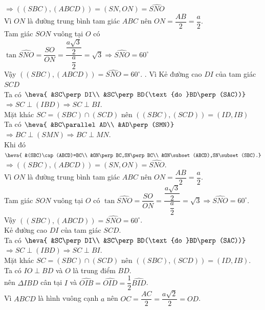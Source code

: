 \begin{ex}
{\begin{itemchoice}
    $\Rightarrow((SBC),(ABCD))=(SN,ON)=\widehat{SNO}$\\
   Vì $ON$  là đường trung bình tam giác $ABC$ nên $ON=\dfrac{AB}{2}=\dfrac{a}{2}$.\\
   Tam giác $SON$ vuông tại $O$ có\\ $\tan\widehat{SNO}=\dfrac{SO}{ON}=\dfrac{\dfrac{a\sqrt 3}{2}}{\dfrac{a}{2}}=\sqrt  3\Rightarrow\widehat{SNO}=60^{\circ}$\\
    Vậy $((SBC),(ABCD))=\widehat{SNO}=60^{\circ}$.
   . Vì 
    Kẻ đường cao $DI$ của tam giác $SCD$\\
   Ta có  $\heva{
   &SC\perp  DI\\
   &SC\perp BD(\text{do }BD\perp (SAC))}$ 
    $\Rightarrow SC\perp (IBD)\Rightarrow SC\perp BI$.\\
   Mặt khác $SC=(SBC)\cap  (SCD)$ nên $((SBC),(SCD))=(ID,IB)$\\
    Ta có $\heva{
    &BC\parallel AD\\
   &AD\perp  (SMN)}$
   $\Rightarrow  BC\perp (SMN)\Rightarrow BC\perp MN$.\\
   Khi đó $\heva{ 
   &(SBC)\cap  (ABCD)=BC\\
   &ON\perp  BC,SN\perp BC\\
   &ON\subset (ABCD),SN\subset  (SBC).}$\\
    $\Rightarrow((SBC),(ABCD))=(SN,ON)=\widehat{SNO}$.\\
   Vì $ON$ là đường trung bình tam  giác $ABC$ nên $ON=\dfrac{AB}{2}=\dfrac{a}{2}$.\\
   Tam giác $SON$ vuông tại $O$ có $\tan\widehat{SNO}=\dfrac{SO}{ON}=\dfrac{\dfrac{a\sqrt  3}{2}}{\dfrac{a}{2}}=\sqrt 3 \Rightarrow\widehat{SNO}=60^{\circ}$.\\
    Vậy $((SBC),(ABCD))=\widehat{SNO}=60^{\circ}$.\\
   Kẻ đường cao $DI$ của tam giác  $SCD$.\\
    Ta có $\heva{
   &SC\perp DI\\ 
   &SC\perp BD(\text{do  }BD\perp (SAC))}$
   $\Rightarrow SC\perp (IBD)\Rightarrow SC\perp BI$.\\ 
   Mặt khác $SC=(SBC)\cap  (SCD)$ nên $((SBC),(SCD))=(ID,IB)$.\\
   Ta có $IO\perp BD$ và $O$ là  trung điểm $BD$.\\
   nên $\Delta IBD$  cân tại $I$ và $\widehat{OIB}=\widehat{OID}=\dfrac{1}{2}\widehat{BID}$.\\
   Vì  $ABCD$ là hình vuông cạnh $a$ nên $OC=\dfrac{AC}{2}=\dfrac{a\sqrt 2}{2}=OD$.\\

\end{itemchoice}}
\end{ex}
